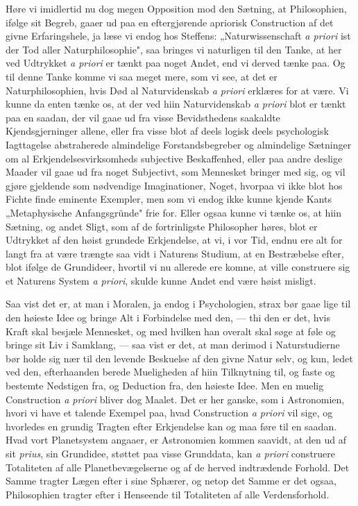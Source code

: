 \documentclass[12pt,a4paper]{book}
\newcommand{\apage}[1]{\marginnote{\footnotesize\textit{[#1]}}}
\begin{document}
{\small Høre vi imidlertid nu dog megen Opposition mod den Sætning, at Philosophien,
ifølge sit Begreb, gaaer ud paa en eftergjørende apriorisk Construction af det givne
Erfaringshele, ja læse vi endog hos Steffens: „Naturwissenschaft \textit{a priori}
ist der Tod aller Naturphilosophie", saa bringes vi naturligen til den Tanke, at her
ved Udtrykket \textit{a priori} er tænkt paa noget Andet, end vi derved tænke paa. Og
til denne Tanke komme vi saa meget mere, som vi see, at det er Naturphilosophien,
hvis Død al Naturvidenskab \textit{a priori} erklæres for at være. Vi kunne da enten
tænke os, at der ved hiin Naturvidenskab \textit{a priori} blot er tænkt paa en
saadan, der vil gaae ud fra visse Bevidsthedens saakaldte Kjendsgjerninger allene,
eller fra visse blot af deels logisk deels psychologisk Iagttagelse abstraherede
almindelige Forstandsbegreber og almindelige Sætninger om al Erkjendelsesvirksomheds
subjective Beskaffenhed, eller paa andre deslige Maader vil gaae ud fra noget
Subjectivt, som Mennesket bringer med sig, og vil gjøre gjeldende som nødvendige
Imaginationer, Noget, hvorpaa vi ikke blot hos Fichte finde eminente Exempler, men
som vi endog ikke kunne kjende Kants „Metaphysische Anfangsgründe" frie for. Eller
ogsaa kunne vi tænke os, at hiin Sætning, og andet Sligt, som af de fortrinligste
Philosopher høres, blot er Udtrykket af den høist grundede Erkjendelse, at vi, i vor
Tid, endnu ere alt for langt fra at være trængte saa vidt i Naturens Studium, at en
Bestræbelse efter, blot ifølge de Grundideer, hvortil vi nu allerede ere komne, at
ville construere sig et Naturens System \textit{a priori}, skulde kunne Andet end
være høist misligt.\par} \apage{55} 

{\small Saa vist det er, at man i Moralen, ja endog i Psychologien, strax bør gaae
lige til den høieste Idee og bringe Alt i Forbindelse med den, --- thi den er det,
hvis Kraft skal besjæle Mennesket, og med hvilken han overalt skal søge at føle og
bringe sit Liv i Samklang, --- saa vist er det, at man derimod i Naturstudierne bør
holde sig nær til den levende Beskuelse af den givne Natur selv, og kun, ledet ved
den, efterhaanden berede Mueligheden af hiin Tilknytning til, og faste og bestemte
Nedstigen fra, og Deduction fra, den høieste Idee. Men en muelig Construction
\textit{a priori} bliver dog Maalet. Det er her ganske, som i Astronomien, hvori vi
have et talende Exempel paa, hvad Construction \textit{a priori} vil sige, og
hvorledes en grundig Tragten efter Erkjendelse kan og maa føre til en saadan. Hvad
vort Planetsystem angaaer, er Astronomien kommen saavidt, at den ud af sit
\textit{prius}, sin Grundidee, støttet paa visse Grunddata, kan \textit{a priori}
construere Totaliteten af alle Planetbevægelserne og af de herved indtrædende
Forhold. Det Samme tragter Lægen efter i sine Sphærer, og netop det Samme er det
ogsaa, Philosophien tragter efter i Henseende til Totaliteten af alle
Verdensforhold.\par}
\end{document}

